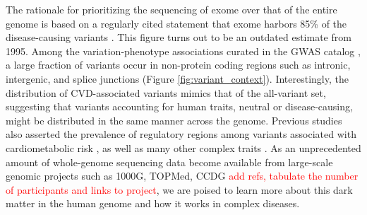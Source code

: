 \documentclass[letter]{bioinfo}
\newcommand{\comment}[1]{\textcolor{red}{#1}}
\begin{document}
The rationale for prioritizing the sequencing of exome over that of the entire genome is based on a regularly cited statement that exome harbors 85\% of the disease-causing variants \citep{Antonarakis:2001:nature}. This figure turns out to be an outdated estimate from 1995. Among the variation-phenotype associations curated in the GWAS catalog \citep{MacArthur:2017:new}, a large fraction of variants occur in non-protein coding regions such as intronic, intergenic, and splice junctions (Figure \ref{fig:variant_context}). Interestingly, the distribution of CVD-associated variants mimics that of the all-variant set, suggesting that variants accounting for human traits, neutral or disease-causing, might be distributed in the same manner across the genome. Previous studies also asserted the prevalence of regulatory regions among variants associated with cardiometabolic risk \citep{Franzen:2016:Cardiometabolic}, as well as many other complex traits \citep{Pickrell:2014:Joint}. As an unprecedented amount of whole-genome sequencing data become available from large-scale genomic projects such as 1000G, TOPMed, CCDG \comment{add refs, tabulate the number of participants and links to project}, we are poised to learn more about this dark matter in the human genome and how it works in complex diseases.
\end{document}
